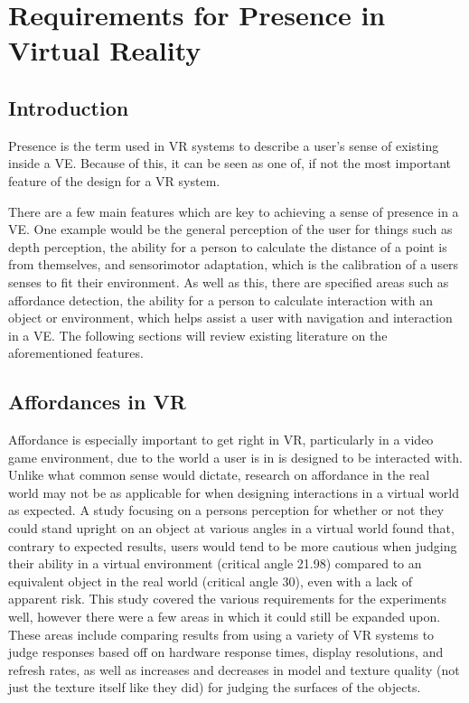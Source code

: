 \section{Requirements for Presence in Virtual Reality}
\label{lr:vr}

\begin{multicols*}{2}
	
	\subsection{Introduction}
	\label{lr:vr:intro}
		Presence is the term used in VR systems to describe a user's sense of existing inside a VE. Because of this, it can be seen as one of, if not the most important feature of the design for a VR system.
		
		There are a few main features which are key to achieving a sense of presence in a VE. One example would be the general perception of the user for things such as depth perception, the ability for a person to calculate the distance of a point is from themselves, and sensorimotor adaptation, which is the calibration of a users senses to fit their environment. 
		As well as this, there are specified areas such as affordance detection, the ability for a person to calculate interaction with an object or environment, which helps assist a user with navigation and interaction in a VE. 
		The following sections will review existing literature on the aforementioned features.
	
	\subsection{Affordances in VR}
	\label{lr:vr:affordances}
		Affordance is especially important to get right in VR, particularly in a video game environment, due to the world a user is in is designed to be interacted with. Unlike what common sense would dictate, research on affordance in the real world may not be as applicable for when designing interactions in a virtual world as expected. A study \cite{Regia-Corte2012} focusing on a persons perception for whether or not they could stand upright on an object at various angles in a virtual world found that, contrary to expected results, users would tend to be more cautious when judging their ability in a virtual environment (critical angle 21.98\degree) compared to an equivalent object in the real world (critical angle 30\degree), even with a lack of apparent risk. 
		This study covered the various requirements for the experiments well, however there were a few areas in which it could still be expanded upon. These areas include comparing results from using a variety of VR systems to judge responses based off on hardware response times, display resolutions, and refresh rates, as well as increases and decreases in model and texture quality (not just the texture itself like they did) for judging the surfaces of the objects.
		

\end{multicols*}
